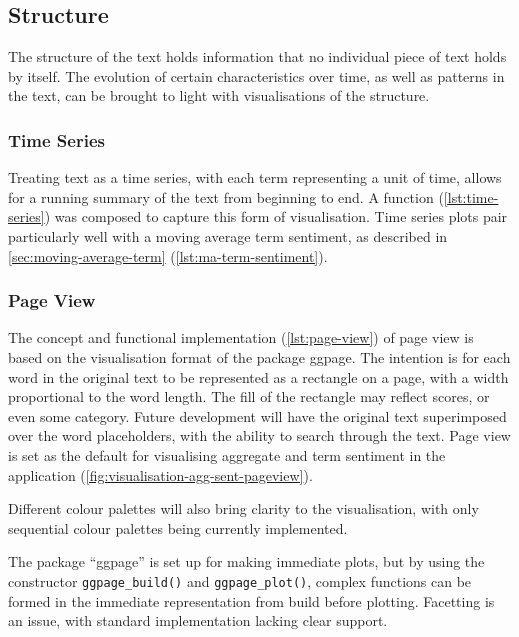 \documentclass[11pt, a4paper, twoside, titlepage]{report}
\begin{document}
\subsection{Structure}\label{sec:structure}

The structure of the text holds information that no individual piece
of text holds by itself. The evolution of certain characteristics over
time, as well as patterns in the text, can be brought to light with
visualisations of the structure.

\subsubsection{Time Series}\label{sec:time-series}

Treating text as a time series, with each term representing a unit of
time, allows for a running summary of the text from beginning to end.
A function (\cref{lst:time-series}) was composed to capture
this form of visualisation. Time series plots pair particularly well
with a moving average term sentiment, as described in
\cref{sec:moving-average-term}
(\cref{lst:ma-term-sentiment}).

\subsubsection{Page View}\label{sec:page-view}

The concept and functional implementation (\cref{lst:page-view}) of
page view is based on the visualisation format of the package ggpage.
The intention is for each word in the original text to be represented
as a rectangle on a page, with a width proportional to the word
length. The fill of the rectangle may reflect scores, or even some
category. Future development will have the original text superimposed
over the word placeholders, with the ability to search through the
text. Page view is set as the default for visualising aggregate and
term sentiment in the application
(\cref{fig:visualisation-agg-sent-pageview}).

Different
colour palettes will also bring clarity to the visualisation, with
only sequential colour palettes being currently implemented.

The package ``ggpage'' is set up for making immediate plots, but by
using the constructor \texttt{ggpage_build()} and
\texttt{ggpage_plot()}, complex functions can be formed in the
immediate representation from build before
plotting\autocite{hvitfeldt19ggpage}. Facetting is an issue, with
standard implementation lacking clear support.
\end{document}
